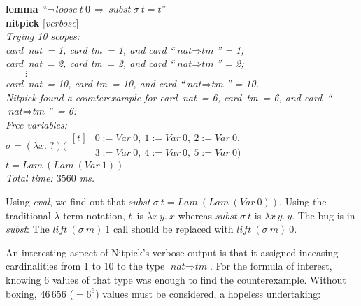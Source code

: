 \documentclass[a4paper,12pt]{article}
\def\unk{{?}}
\def\undef{(\lambda x.\; \unk)}
\begin{document}
\pre
\textbf{lemma}~``$\lnot\,\textit{loose}~t~0 \,\Longrightarrow\, \textit{subst}~\sigma~t = t$'' \\
\textbf{nitpick} [\textit{verbose}] \\[2\smallskipamount]
\slshape
Trying 10 scopes: \nopagebreak \\
\hbox{}\qquad \textit{card~nat}~= 1, \textit{card tm}~= 1, and \textit{card} ``$\textit{nat} \Rightarrow \textit{tm}$'' = 1; \\
\hbox{}\qquad \textit{card~nat}~= 2, \textit{card tm}~= 2, and \textit{card} ``$\textit{nat} \Rightarrow \textit{tm}$'' = 2; \\
\hbox{}\qquad $\qquad\vdots$ \\[.5\smallskipamount]
\hbox{}\qquad \textit{card~nat}~= 10, \textit{card tm}~= 10, and \textit{card} ``$\textit{nat} \Rightarrow \textit{tm}$'' = 10. \\[2\smallskipamount]
Nitpick found a counterexample for \textit{card~nat}~= 6, \textit{card~tm}~= 6,
and \textit{card}~``$\textit{nat} \Rightarrow \textit{tm}$''~= 6: \\[2\smallskipamount]
\hbox{}\qquad Free variables: \nopagebreak \\
\hbox{}\qquad\qquad $\sigma = \undef(\!\begin{aligned}[t]
& 0 := \textit{Var}~0,\>
  1 := \textit{Var}~0,\>
  2 := \textit{Var}~0, \\[-2pt]
& 3 := \textit{Var}~0,\>
  4 := \textit{Var}~0,\>
  5 := \textit{Var}~0)\end{aligned}$ \\
\hbox{}\qquad\qquad $t = \textit{Lam}~(\textit{Lam}~(\textit{Var}~1))$ \\[2\smallskipamount]
Total time: $3560$ ms.
\postw

Using \textit{eval}, we find out that $\textit{subst}~\sigma~t =
\textit{Lam}~(\textit{Lam}~(\textit{Var}~0))$. Using the traditional
$\lambda$-term notation, $t$~is
$\lambda x\, y.\> x$ whereas $\textit{subst}~\sigma~t$ is $\lambda x\, y.\> y$.
The bug is in \textit{subst\/}: The $\textit{lift}~(\sigma~m)~1$ call should be
replaced with $\textit{lift}~(\sigma~m)~0$.

An interesting aspect of Nitpick's verbose output is that it assigned inceasing
cardinalities from 1 to 10 to the type $\textit{nat} \Rightarrow \textit{tm}$.
For the formula of interest, knowing 6 values of that type was enough to find
the counterexample. Without boxing, $46\,656$ ($= 6^6$) values must be
considered, a hopeless undertaking:
\end{document}
